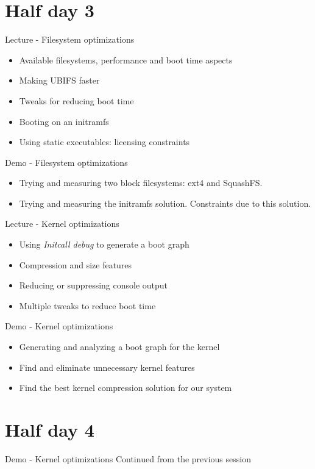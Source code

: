 \documentclass[a4paper,12pt,obeyspaces,spaces,hyphens]{article}
\begin{document}
\section{Half day 3}

\feagendatwocolumn
{Lecture - Filesystem optimizations}
{
  \begin{itemize}
  \item Available filesystems, performance and boot time aspects
  \item Making UBIFS faster
  \item Tweaks for reducing boot time
  \item Booting on an initramfs
  \item Using static executables: licensing constraints
  \end{itemize}
}
{Demo - Filesystem optimizations}
{
 \begin{itemize}
 \item Trying and measuring two block filesystems: ext4 and SquashFS.
 \item Trying and measuring the initramfs solution. Constraints
       due to this solution.
 \end{itemize}
}

\feagendatwocolumn
{Lecture - Kernel optimizations}
{
  \begin{itemize}
  \item Using {\em Initcall debug} to generate a boot graph
  \item Compression and size features
  \item Reducing or suppressing console output
  \item Multiple tweaks to reduce boot time
  \end{itemize}
}
{Demo - Kernel optimizations}
{
 \begin{itemize}
 \item Generating and analyzing a boot graph for the kernel
 \item Find and eliminate unnecessary kernel features
 \item Find the best kernel compression solution for our system
 \end{itemize}
}

\section{Half day 4}

\feagendaonecolumn
{Demo - Kernel optimizations}
{
 Continued from the previous session
}
\end{document}
